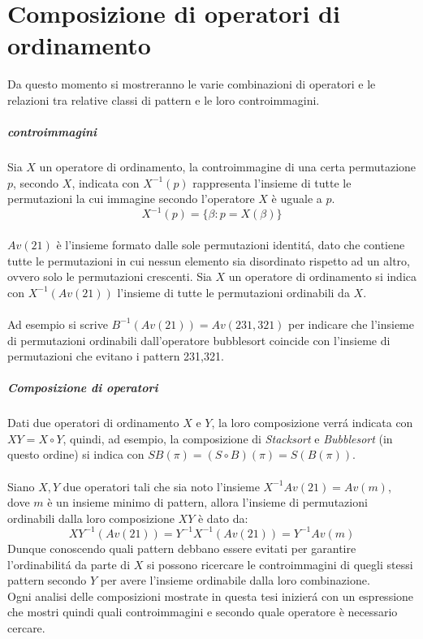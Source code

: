 \chapter{Composizione di operatori di ordinamento}
Da questo momento si mostreranno le varie combinazioni di operatori e le relazioni tra relative classi di pattern e le loro controimmagini.
\paragraph*{controimmagini} Sia $X$ un operatore di ordinamento, la controimmagine di una certa permutazione $p$, secondo $X$, indicata con $X^{-1}(p)$ rappresenta l'insieme di tutte le permutazioni la cui immagine secondo l'operatore $X$ \`e uguale a $p$.$$X^{-1}(p) = \{\beta : p = X(\beta)\}$$\\
$Av(21)$ \`e l'insieme formato dalle sole permutazioni identit\'a, dato che contiene tutte le permutazioni in cui nessun elemento sia disordinato rispetto ad un altro, ovvero solo le permutazioni crescenti. Sia $X$ un operatore di ordinamento si indica con $X^{-1}(Av(21))$ l'insieme di tutte le permutazioni ordinabili da $X$.\\\\
Ad esempio si scrive $B^{-1}(Av(21)) = Av(231,321)$ per indicare che l'insieme di permutazioni ordinabili dall'operatore bubblesort coincide con l'insieme di permutazioni che evitano i pattern 231,321\cite{claesson2012sorting}.
\paragraph*{Composizione di operatori} Dati due operatori di ordinamento $X$ e $Y$, la loro composizione verr\'a indicata con $ XY = X \circ Y$, quindi, ad esempio, la composizione di \textit{Stacksort} e \textit{Bubblesort} (in questo ordine) si indica con $SB(\pi) = (S \circ B)(\pi) = S(B(\pi))$.\\\\
Siano $X,Y$ due operatori tali che sia noto l'insieme $X^{-1}Av(21) = Av(m)$, dove $m$ \`e un insieme minimo di pattern, allora l'insieme di permutazioni ordinabili dalla loro composizione $XY$ \`e dato da:
$$XY^{-1}(Av(21)) = Y^{-1}X^{-1}(Av(21)) = Y^{-1}Av(m)$$ 
Dunque conoscendo quali pattern debbano essere evitati per garantire l'ordinabilit\'a da parte di $X$ si possono ricercare le controimmagini di quegli stessi pattern secondo $Y$ per avere l'insieme ordinabile dalla loro combinazione.\\Ogni analisi delle composizioni mostrate in questa tesi inizier\'a con un espressione che mostri quindi quali controimmagini e secondo quale operatore \`e necessario cercare.
